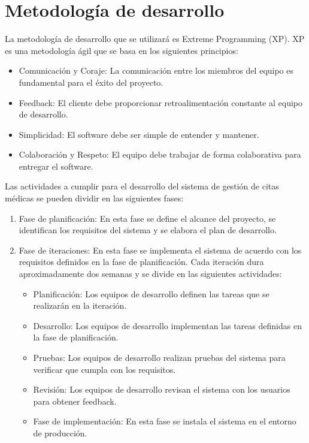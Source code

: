 \documentclass{article}
\theoremstyle{mytheoremstyle}
\theoremstyle{mytheoremstyle}
\theoremstyle{myproblemstyle}
\begin{document}
\section{Metodología de desarrollo}
La metodología de desarrollo que se utilizará es Extreme Programming (XP). XP
es una metodología ágil que se basa en los siguientes principios:

\begin{itemize}
	\item Comunicación y Coraje: La comunicación entre los miembros del equipo es
	      fundamental para el éxito del proyecto.
	\item Feedback: El cliente debe proporcionar retroalimentación constante al equipo de
	      desarrollo.
	\item Simplicidad: El software debe ser simple de entender y mantener.
	\item Colaboración y Respeto: El equipo debe trabajar de forma colaborativa para
	      entregar el software.

\end{itemize}

Las actividades a cumplir para el desarrollo del sistema de gestión de citas
médicas se pueden dividir en las siguientes fases:
\begin{enumerate}
	\item Fase de planificación: En esta fase se define el alcance del proyecto, se
	      identifican los requisitos del sistema y se elabora el plan de desarrollo.
	\item Fase de iteraciones: En esta fase se implementa el sistema de acuerdo con los
	      requisitos definidos en la fase de planificación. Cada iteración dura
	      aproximadamente dos semanas y se divide en las siguientes actividades:
	      \begin{itemize}
		      \item   Planificación: Los equipos de desarrollo definen las tareas que se realizarán
		            en la iteración.
		      \item  Desarrollo: Los equipos de desarrollo implementan las tareas definidas en la
		            fase de planificación.
		      \item  Pruebas: Los equipos de desarrollo realizan pruebas del sistema para verificar
		            que cumpla con los requisitos.
		      \item  Revisión: Los equipos de desarrollo revisan el sistema con los usuarios para
		            obtener feedback.
		      \item Fase de implementación: En esta fase se instala el sistema en el entorno de
		            producción.
	      \end{itemize}
\end{enumerate}
\end{document}
